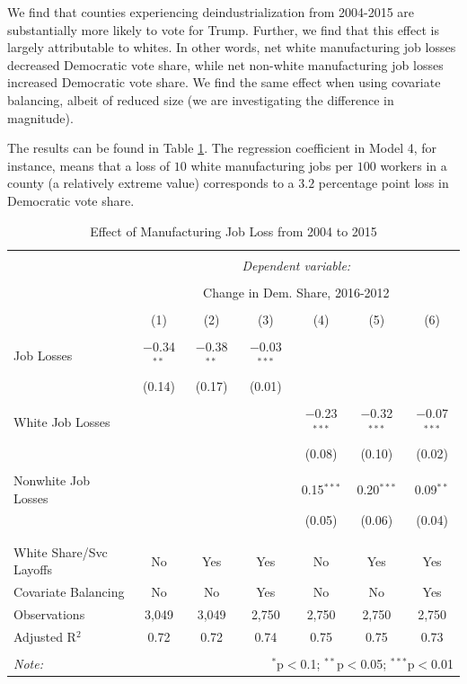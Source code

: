 \documentclass[]{AEA}
\begin{document}
We find that counties experiencing deindustrialization from 2004-2015
are substantially more likely to vote for Trump. Further, we find that
this effect is largely attributable to whites. In other words, net white
manufacturing job losses decreased Democratic vote share, while net
non-white manufacturing job losses increased Democratic vote share. We
find the same effect when using covariate balancing, albeit of reduced
size (we are investigating the difference in magnitude).

The results can be found in Table \ref{regResult04}. The regression
coefficient in Model 4, for instance, means that a loss of \(10\) white
manufacturing jobs per \(100\) workers in a county (a relatively extreme
value) corresponds to a \(3.2\) percentage point loss in Democratic vote
share. \FloatBarrier

\begin{table}[!htbp] \centering 
  \caption{Effect of Manufacturing Job Loss from 2004 to 2015} 
  \label{regResult04} 
\small 
\begin{tabular}{@{\extracolsep{2pt}}lcccccc} 
\\[-1.8ex]\hline 
\hline \\[-1.8ex] 
 & \multicolumn{6}{c}{\textit{Dependent variable:}} \\ 
\cline{2-7} 
\\[-1.8ex] & \multicolumn{6}{c}{Change in Dem. Share, 2016-2012} \\ 
\\[-1.8ex] & (1) & (2) & (3) & (4) & (5) & (6)\\ 
\hline \\[-1.8ex] 
 Job Losses & $-$0.34$^{**}$ & $-$0.38$^{**}$ & $-$0.03$^{***}$ &  &  &  \\ 
  & (0.14) & (0.17) & (0.01) &  &  &  \\ 
  & & & & & & \\ 
 White Job Losses &  &  &  & $-$0.23$^{***}$ & $-$0.32$^{***}$ & $-$0.07$^{***}$ \\ 
  &  &  &  & (0.08) & (0.10) & (0.02) \\ 
  & & & & & & \\ 
 Nonwhite Job Losses &  &  &  & 0.15$^{***}$ & 0.20$^{***}$ & 0.09$^{**}$ \\ 
  &  &  &  & (0.05) & (0.06) & (0.04) \\ 
  & & & & & & \\ 
\hline \\[-1.8ex] 
White Share/Svc Layoffs & No & Yes & Yes & No & Yes & Yes \\ 
Covariate Balancing & No & No & Yes & No & No & Yes \\ 
Observations & 3,049 & 3,049 & 2,750 & 2,750 & 2,750 & 2,750 \\ 
Adjusted R$^{2}$ & 0.72 & 0.72 & 0.74 & 0.75 & 0.75 & 0.73 \\ 
\hline 
\hline \\[-1.8ex] 
\textit{Note:}  & \multicolumn{6}{r}{$^{*}$p$<$0.1; $^{**}$p$<$0.05; $^{***}$p$<$0.01} \\ 
\end{tabular} 
\end{table} 
\FloatBarrier
\end{document}
